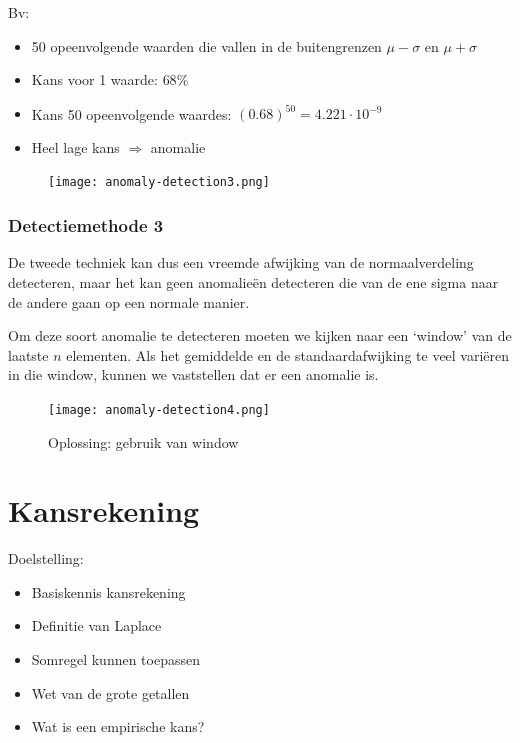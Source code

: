 \documentclass{article}
\begin{document}
Bv: 

\begin{itemize}
    \item 50 opeenvolgende waarden die vallen in de buitengrenzen $\mu - \sigma$ en $\mu + \sigma$
    \item Kans voor 1 waarde: $68\%$
    \item Kans 50 opeenvolgende waardes: $(0.68)^{50} = 4.221 \cdot 10^{-9}$
    \item Heel lage kans $\Rightarrow$ anomalie
\end{itemize}

\begin{figure}[H]
    \centering
    \texttt{[image: anomaly-detection3.png]}
\end{figure}


\subsubsection{Detectiemethode 3}

De tweede techniek kan dus een vreemde afwijking van de normaalverdeling detecteren, maar
het kan geen anomalieën detecteren die van de ene sigma naar de andere gaan op een normale manier.

Om deze soort anomalie te detecteren moeten we kijken naar een `window' van de laatste $n$ elementen.
Als het gemiddelde en de standaardafwijking te veel variëren in die window, kunnen we vaststellen dat er een anomalie is.


\begin{figure}[H]
    \centering
    \texttt{[image: anomaly-detection4.png]}
    \caption{Oplossing: gebruik van window}
\end{figure}

\section{Kansrekening}

Doelstelling: 

\begin{itemize}
    \item Basiskennis kansrekening
    \item Definitie van Laplace
    \item Somregel kunnen toepassen
    \item Wet van de grote getallen
    \item Wat is een empirische kans?
\end{itemize}
\end{document}
